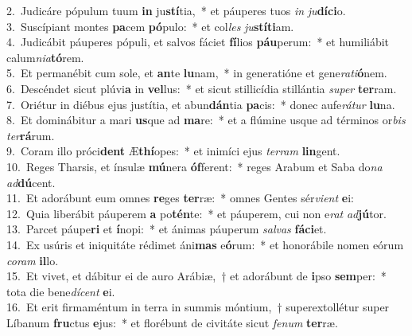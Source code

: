 {2.~}Judicáre pópulum tuum \textbf{in} ju\textbf{stí}tia,~* et páuperes tuos \textit{in} \textit{ju}\textbf{dí}\textbf{ci}o.\\
{3.~}Suscípiant montes \textbf{pa}cem \textbf{pó}pulo:~* et col\textit{les} \textit{ju}\textbf{stí}\textbf{ti}am.\\
{4.~}Judicábit páuperes pópuli, et salvos fáciet \textbf{fí}lios \textbf{páu}perum:~* et humiliábit calum\textit{ni}\textit{a}\textbf{tó}rem.\\
{5.~}Et permanébit cum sole, et \textbf{an}te \textbf{lu}nam,~* in generatióne et gene\textit{ra}\textit{ti}\textbf{ó}nem.\\
{6.~}Descéndet sicut plúvi\textbf{a} in \textbf{vel}lus:~* et sicut stillicídia stillántia \textit{su}\textit{per} \textbf{ter}ram.\\
{7.~}Oriétur in diébus ejus justítia, et abun\textbf{dán}tia \textbf{pa}cis:~* donec aufe\textit{rá}\textit{tur} \textbf{lu}na.\\
{8.~}Et dominábitur a mari \textbf{us}que ad \textbf{ma}re:~* et a flúmine usque ad términos or\textit{bis} \textit{ter}\textbf{rá}rum.\\
{9.~}Coram illo próci\textbf{dent} Æ\textbf{thí}opes:~* et inimíci ejus \textit{ter}\textit{ram} \textbf{lin}gent.\\
{10.~}Reges Tharsis, et ínsulæ \textbf{mú}nera \textbf{óf}ferent:~* reges Arabum et Saba do\textit{na} \textit{ad}\textbf{dú}cent.\\
{11.~}Et adorábunt eum omnes \textbf{re}ges \textbf{ter}ræ:~* omnes Gentes sér\textit{vi}\textit{ent} \textbf{e}i:\\
{12.~}Quia liberábit páuperem \textbf{a} po\textbf{tén}te:~* et páuperem, cui non e\textit{rat} \textit{ad}\textbf{jú}tor.\\
{13.~}Parcet páupe\textbf{ri} et \textbf{í}nopi:~* et ánimas páuperum \textit{sal}\textit{vas} \textbf{fá}\textbf{ci}et.\\
{14.~}Ex usúris et iniquitáte rédimet áni\textbf{mas} e\textbf{ó}rum:~* et honorábile nomen eórum \textit{co}\textit{ram} \textbf{il}lo.\\
{15.~}Et vivet, et dábitur ei de auro Arábiæ,~† et adorábunt de \textbf{i}pso \textbf{sem}per:~* tota die bene\textit{dí}\textit{cent} \textbf{e}i.\\
{16.~}Et erit firmaméntum in terra in summis móntium,~† superextollétur super Líbanum \textbf{fru}ctus \textbf{e}jus:~* et florébunt de civitáte sicut \textit{fe}\textit{num} \textbf{ter}ræ.\\
